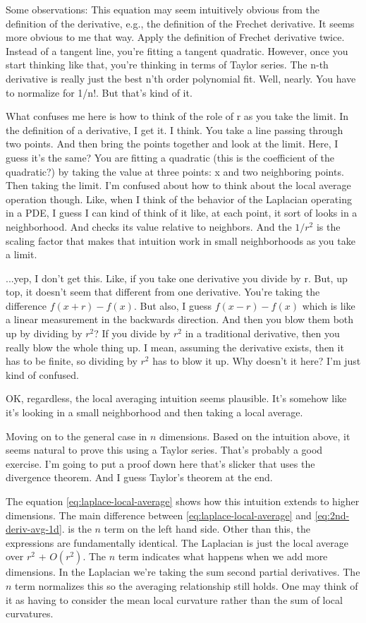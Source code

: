 Some observations:
This equation may seem intuitively obvious from the definition of the derivative, e.g., the definition of the Frechet derivative. It seems more obvious to me that way. Apply the definition of Frechet derivative twice. Instead of a tangent line, you're fitting a tangent quadratic. However, once you start thinking like that, you're thinking in terms of Taylor series. The n-th derivative is really just the best n'th order polynomial fit. Well, nearly. You have to normalize for 1/n!. But that's kind of it.

What confuses me here is how to think of the role of r as you take the limit. In the definition of a derivative, I get it. I think. You take a line passing through two points. And then bring the points together and look at the limit. Here, I guess it's the same? You are fitting a quadratic (this is the coefficient of the quadratic?) by taking the value at three points: x and two neighboring points. Then taking the limit. I'm confused about how to think about the local average operation though. Like, when I think of the behavior of the Laplacian operating in a PDE, I guess I can kind of think of it like, at each point, it sort of looks in a neighborhood. And checks its value relative to neighbors. And the $1/r^2$ is the scaling factor that makes that intuition work in small neighborhoods as you take a limit. 

...yep, I don't get this. Like, if you take one derivative you divide by r. But, up top, it doesn't seem that different from one derivative. You're taking the difference $f(x+r) - f(x)$. But also, I guess $f(x-r) - f(x)$ which is like a linear measurement in the backwards direction. And then you blow them both up by dividing by $r^2$? If you divide by $r^2$ in a traditional derivative, then you really blow the whole thing up. I mean, assuming the derivative exists, then it has to be finite, so dividing by $r^2$ has to blow it up. Why doesn't it here? I'm just kind of confused. 

OK, regardless, the local averaging intuition seems plausible. It's somehow like it's looking in a small neighborhood and then taking a local average. 

Moving on to the general case in $n$ dimensions. Based on the intuition above, it seems natural to prove this using a Taylor series. That's probably a good exercise. I'm going to put a proof down here that's slicker that uses the divergence theorem. And I guess Taylor's theorem at the end. 

The equation \eqref{eq:laplace-local-average} shows how this intuition extends to higher dimensions. The main difference between \eqref{eq:laplace-local-average}  and \eqref{eq:2nd-deriv-avg-1d}. is the $n$ term on the left hand side. Other than this, the expressions are fundamentally identical. The Laplacian is just the local average over $r^2$ + $O(r^2)$. The $n$ term indicates what happens when we add more dimensions. In the Laplacian we're taking the sum second partial derivatives. The $n$ term normalizes this so the averaging relationship still holds. One may think of it as having to consider the mean local curvature rather than the sum of local curvatures. 

